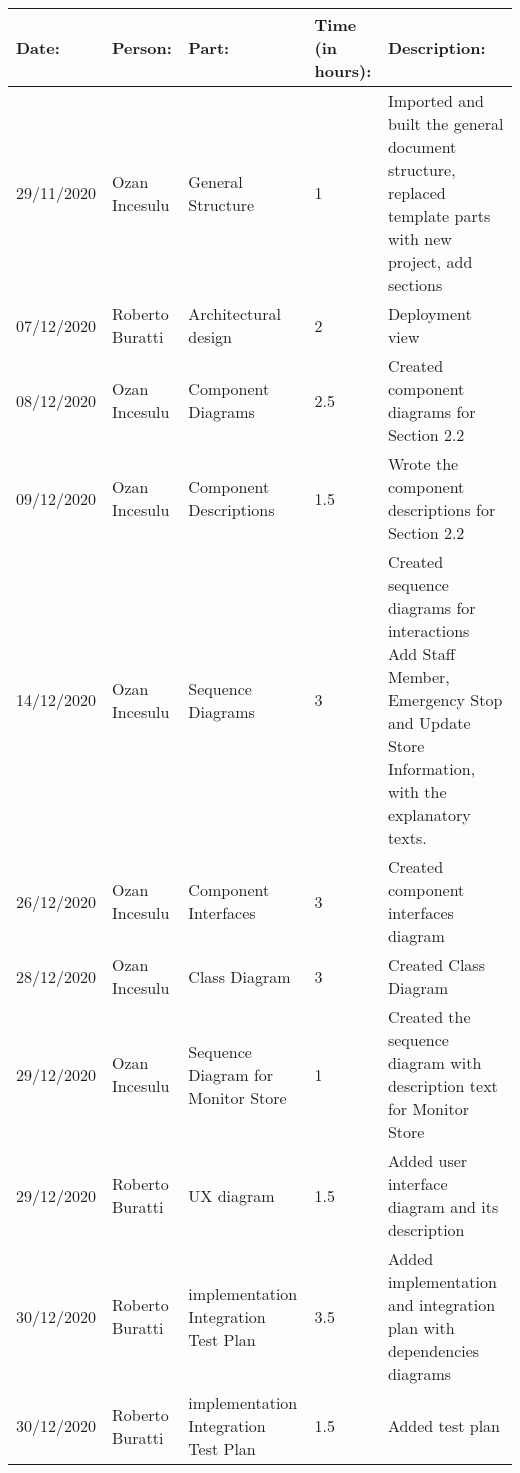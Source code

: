 \begin{table}[h]
    \begin{tabular}{|p{2cm}|p{2cm}|p{2cm}|p{1.5cm}|p{8cm}|}
        \hline

        Date:      & Person:       & Part:             & Time (in hours): & Description:                                       \\ \hline
        29/11/2020 & Ozan Incesulu & General Structure & 1             & Imported and built the general document structure, replaced template parts with new project, add sections\\ \hline
        07/12/2020 & Roberto Buratti & Architectural design & 2                 & Deployment view\\ \hline
        08/12/2020 & Ozan Incesulu & Component Diagrams & 2.5 & Created component diagrams for Section 2.2 \\ \hline
        09/12/2020 & Ozan Incesulu & Component Descriptions & 1.5 & Wrote the component descriptions for Section 2.2 \\ \hline
        14/12/2020 & Ozan Incesulu & Sequence Diagrams& 3 & Created sequence diagrams for interactions Add Staff Member, Emergency Stop and Update Store Information, with the explanatory texts.\\ \hline
        26/12/2020 & Ozan Incesulu & Component Interfaces & 3 & Created component interfaces diagram \\ \hline
        28/12/2020 & Ozan Incesulu & Class Diagram & 3 & Created Class Diagram \\ \hline
        29/12/2020 & Ozan Incesulu & Sequence Diagram for Monitor Store & 1 & Created the sequence diagram with description text for Monitor Store \\ \hline
        29/12/2020 & Roberto Buratti & UX diagram & 1.5                 & Added user interface diagram and its description\\ \hline
        30/12/2020 & Roberto Buratti & implementation Integration Test Plan & 3.5                 & Added implementation and integration plan with dependencies diagrams\\ \hline
        30/12/2020 & Roberto Buratti & implementation Integration Test Plan & 1.5                 & Added test plan\\ \hline
    \end{tabular}
\end{table}
